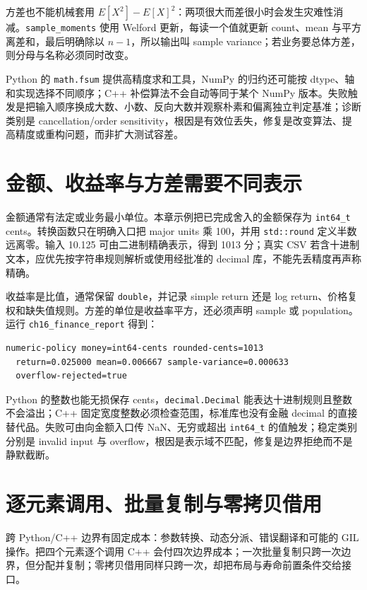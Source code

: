 

方差也不能机械套用 $E[X^2]-E[X]^2$：两项很大而差很小时会发生灾难性消减。\texttt{sample\_moments} 使用 Welford 更新，每读一个值就更新 count、mean 与平方离差和，最后明确除以 $n-1$，所以输出叫 sample variance；若业务要总体方差，则分母与名称必须同时改变。

Python 的 \texttt{math.fsum} 提供高精度求和工具，NumPy 的归约还可能按 dtype、轴和实现选择不同顺序；C++ 补偿算法不会自动等同于某个 NumPy 版本。失败触发是把输入顺序换成大数、小数、反向大数并观察朴素和偏离独立判定基准；诊断类别是 cancellation/order sensitivity，根因是有效位丢失，修复是改变算法、提高精度或重构问题，而非扩大测试容差。

\section{金额、收益率与方差需要不同表示}

金额通常有法定或业务最小单位。本章示例把已完成舍入的金额保存为 \texttt{int64\_t} cents。转换函数只在明确入口把 major units 乘 100，并用 \texttt{std::round} 定义半数远离零。输入 10.125 可由二进制精确表示，得到 1013 分；真实 CSV 若含十进制文本，应优先按字符串规则解析或使用经批准的 decimal 库，不能先丢精度再声称精确。

收益率是比值，通常保留 \texttt{double}，并记录 simple return 还是 log return、价格复权和缺失值规则。方差的单位是收益率平方，还必须声明 sample 或 population。运行 \texttt{ch16\_finance\_report} 得到：

\begin{lstlisting}[numbers=none]
numeric-policy money=int64-cents rounded-cents=1013
  return=0.025000 mean=0.006667 sample-variance=0.000633
  overflow-rejected=true
\end{lstlisting}

Python 的整数也能无损保存 cents，\texttt{decimal.Decimal} 能表达十进制规则且整数不会溢出；C++ 固定宽度整数必须检查范围，标准库也没有金融 decimal 的直接替代品。失败可由向金额入口传 NaN、无穷或超出 \texttt{int64\_t} 的值触发；稳定类别分别是 invalid input 与 overflow，根因是表示域不匹配，修复是边界拒绝而不是静默截断。

\section{逐元素调用、批量复制与零拷贝借用}

跨 Python/C++ 边界有固定成本：参数转换、动态分派、错误翻译和可能的 GIL 操作。把四个元素逐个调用 C++ 会付四次边界成本；一次批量复制只跨一次边界，但分配并复制；零拷贝借用同样只跨一次，却把布局与寿命前置条件交给接口。


